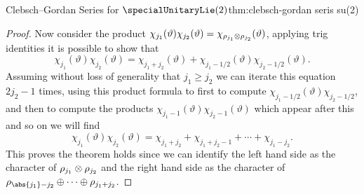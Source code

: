 \begin{thm}{Clebsch--Gordan Series for \(\specialUnitaryLie(2)\)}{thm:clebsch-gordan seris su(2)}
\begin{proof}
        Now consider the product \(\chi_{j_1}(\vartheta)\chi_{j_2}(\vartheta) = \chi_{\rho_{j_1} \otimes \rho_{j_2}}(\vartheta)\), applying trig identities it is possible to show that
        \begin{equation}
            \chi_{j_1}(\vartheta)\chi_{j_2}(\vartheta) = \chi_{j_1 + j_2}(\vartheta) + \chi_{j_1 - 1/2}(\vartheta) \chi_{j_2 - 1/2}(\vartheta).
        \end{equation}
        Assuming without loss of generality that \(j_1 \ge j_2\) we can iterate this equation \(2j_2 - 1\) times, using this product formula to first to compute \(\chi_{j_1 - 1/2}(\vartheta)\chi_{j_2 - 1/2}\), and then to compute the products \(\chi_{j_1 - 1}(\vartheta)\chi_{j_2 - 1}(\vartheta)\) which appear after this and so on we will find
        \begin{equation}
            \chi_{j_1}(\vartheta)\chi_{j_2}(\vartheta) = \chi_{j_1 + j_2} + \chi_{j_1 + j_2 - 1} + \dotsb + \chi_{j_1 - j_2}.
        \end{equation}
        This proves the theorem holds since we can identify the left hand side as the character of \(\rho_{j_1}\otimes \rho_{j_2}\) and the right hand side as the character of \(\rho_{\abs{j_1} - j_2} \directsum \dotsb \directsum \rho_{j_1 + j_2}\).
    \end{proof}
\end{thm}

